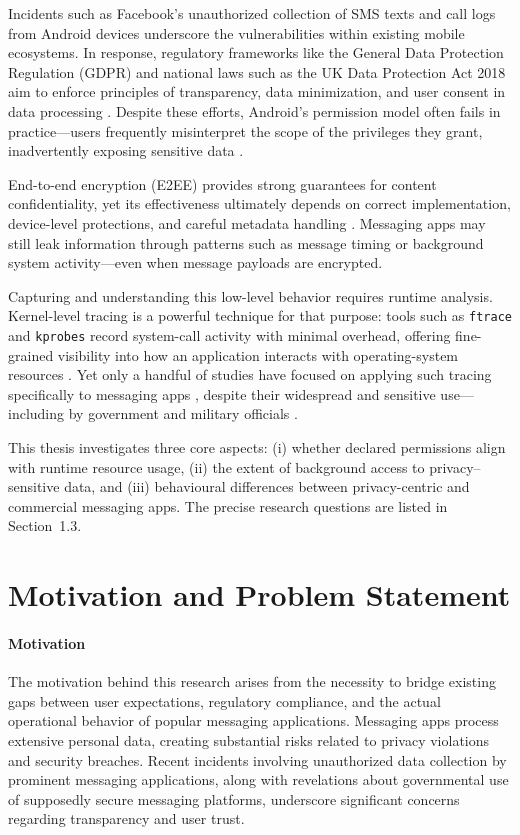 \documentclass[a4paper,12pt]{report}
\begin{document}
Incidents such as Facebook’s unauthorized collection of SMS texts and call logs
from Android devices \cite{ArsTechnica2018} underscore the vulnerabilities
within existing mobile ecosystems. In response, regulatory frameworks like the
General Data Protection Regulation (GDPR) and national laws such as the UK Data
Protection Act 2018 aim to enforce principles of transparency, data
minimization, and user consent in data processing
\cite{GDPR2016,UKDPA2018}. Despite these efforts, Android’s permission model
often fails in practice—users frequently misinterpret the scope of the
privileges they grant, inadvertently exposing sensitive data \cite{CHI2024Permissions}.

End-to-end encryption (E2EE) provides strong guarantees for content
confidentiality, yet its effectiveness ultimately depends on correct
implementation, device-level protections, and careful metadata handling
\cite{arxiv2020metadata,wired2023signalhack}. Messaging apps may still leak
information through patterns such as message timing or background system
activity—even when message payloads are encrypted.

Capturing and understanding this low-level behavior requires runtime analysis.
Kernel-level tracing is a powerful technique for that purpose: tools such as
\texttt{ftrace} and \texttt{kprobes} record system-call activity with minimal
overhead, offering fine-grained visibility into how an application interacts
with operating-system resources \cite{BPFroid2021,AOSP2024Ftrace}. Yet only a
handful of studies have focused on applying such tracing specifically to
messaging apps \cite{SLR2025Messaging}, despite their widespread and sensitive
use—including by government and military officials
\cite{Politico2025Signal}.

This thesis investigates three core aspects:
(i) whether declared permissions align with runtime resource usage,
(ii) the extent of background access to privacy–sensitive data,
and (iii) behavioural differences between privacy-centric and commercial messaging apps.
The precise research questions are listed in Section~1.3.

\section{Motivation and Problem Statement}

\paragraph{Motivation}
The motivation behind this research arises from the necessity to bridge existing
gaps between user expectations, regulatory compliance, and the actual operational
behavior of popular messaging applications. Messaging apps process extensive personal
data, creating substantial risks related to privacy violations and security breaches.
Recent incidents involving unauthorized data collection by prominent messaging
applications, along with revelations about governmental use of supposedly secure
messaging platforms, underscore significant concerns regarding transparency
and user trust.
\end{document}
